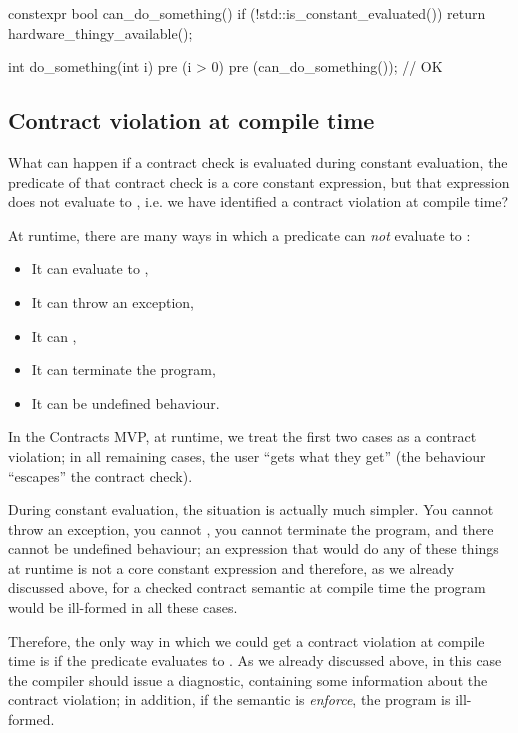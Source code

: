 \begin{codeblock}
constexpr bool can_do_something() {
  if (!std::is_constant_evaluated())
    return hardware_thingy_available();
}

int do_something(int i)
  pre (i > 0)
  pre (can_do_something());  // OK
\end{codeblock}

\subsection{Contract violation at compile time}

What can happen if a contract check is evaluated during constant evaluation, the predicate of that contract check is a core constant expression, but that expression does not evaluate to , i.e. we have identified a contract violation at compile time?

At runtime, there are many ways in which a predicate can \emph{not} evaluate to :
\begin{itemize}
\item It can evaluate to ,
\item It can throw an exception,
\item It can ,
\item It can terminate the program,
\item It can be undefined behaviour.
\end{itemize}
In the Contracts MVP, at runtime, we treat the first two cases as a contract violation; in all remaining cases, the user ``gets what they get'' (the behaviour ``escapes'' the contract check).

During constant evaluation, the situation is actually much simpler. You cannot throw an exception, you cannot , you cannot terminate the program, and there cannot be undefined behaviour; an expression that would do any of these things at runtime is not a core constant expression and therefore, as we already discussed above, for a checked contract semantic at compile time the program would be ill-formed in all these cases.

Therefore, the only way in which we could get a contract violation at compile time is if the predicate evaluates to . As we already discussed above, in this case the compiler should issue a diagnostic, containing some information about the contract violation; in addition, if the semantic is \emph{enforce}, the program is ill-formed.

